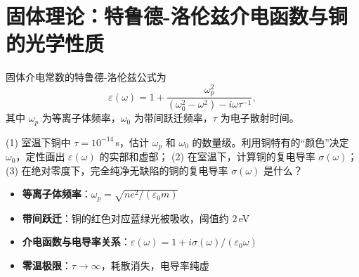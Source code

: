 \section{固体理论：特鲁德-洛伦兹介电函数与铜的光学性质}
\label{sec:drude-lorentz-dielectric}

\begin{modelbox}
固体介电常数的特鲁德-洛伦兹公式为
\begin{equation}
\varepsilon(\omega)=1+\frac{\omega_p^2}{(\omega_0^2-\omega^2)-i\omega\tau^{-1}},
\end{equation}
其中 $\omega_p$ 为等离子体频率，$\omega_0$ 为带间跃迁频率，$\tau$ 为电子散射时间。

(1) 室温下铜中 $\tau=10^{-14}\,$s，估计 $\omega_p$ 和 $\omega_0$ 的数量级。利用铜特有的``颜色''决定 $\omega_0$，定性画出 $\varepsilon(\omega)$ 的实部和虚部；
(2) 在室温下，计算铜的复电导率 $\sigma(\omega)$；
(3) 在绝对零度下，完全纯净无缺陷的铜的复电导率 $\sigma(\omega)$ 是什么？
\end{modelbox}

\begin{tipbox}[考点快速分析]
\begin{itemize}
    \item \textbf{等离子体频率}：$\omega_p=\sqrt{ne^2/(\varepsilon_0 m)}$
    \item \textbf{带间跃迁}：铜的红色对应蓝绿光被吸收，阈值约 $2\,$eV
    \item \textbf{介电函数与电导率关系}：$\varepsilon(\omega)=1+i\sigma(\omega)/(\varepsilon_0\omega)$
    \item \textbf{零温极限}：$\tau\to\infty$，耗散消失，电导率纯虚
\end{itemize}
\end{tipbox}

